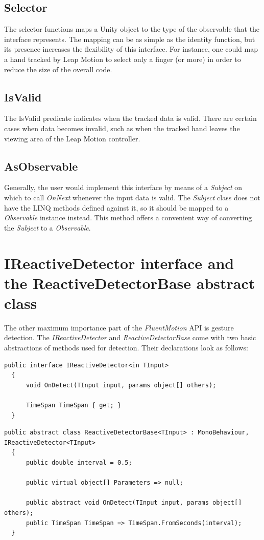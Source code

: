 \documentclass[12pt,a4paper,twoside]{report}
\begin{document}
\subsection{Selector}
The selector functions maps a Unity object to the type of the observable that the interface represents. The mapping can be as simple as the identity function, but its presence increases the flexibility of this interface. For instance, one could map a hand tracked by Leap Motion to select only a finger (or more) in order to reduce the size of the overall code.

\subsection{IsValid}
The IsValid predicate indicates when the tracked data is valid. There are certain cases when data becomes invalid, such as when the tracked hand leaves the viewing area of the Leap Motion controller.

\subsection{AsObservable}
Generally, the user would implement this interface by means of a \textit{Subject} on which to call \textit{OnNext} whenever the input data is valid. The \textit{Subject} class does not have the LINQ methods defined against it, so it should be mapped to a \textit{Observable} instance instead. This method offers a convenient way of converting the \textit{Subject} to a \textit{Observable}.

\section{IReactiveDetector interface and the ReactiveDetectorBase abstract class}
The other maximum importance part of the \textit{FluentMotion} API is gesture detection. The \textit{IReactiveDetector} and \textit{ReactiveDetectorBase} come with two basic abstractions of methods used for detection. Their declarations look as follows:

\begin{lstlisting}[caption=IReactiveDetector interface]
  public interface IReactiveDetector<in TInput>
  {
      void OnDetect(TInput input, params object[] others);

      TimeSpan TimeSpan { get; }
  }
\end{lstlisting}

\begin{lstlisting}[caption=ReactiveDetectorBase abstract class]
  public abstract class ReactiveDetectorBase<TInput> : MonoBehaviour, IReactiveDetector<TInput>
  {
      public double interval = 0.5;

      public virtual object[] Parameters => null;

      public abstract void OnDetect(TInput input, params object[] others);
      public TimeSpan TimeSpan => TimeSpan.FromSeconds(interval);
  }
\end{lstlisting}
\end{document}
